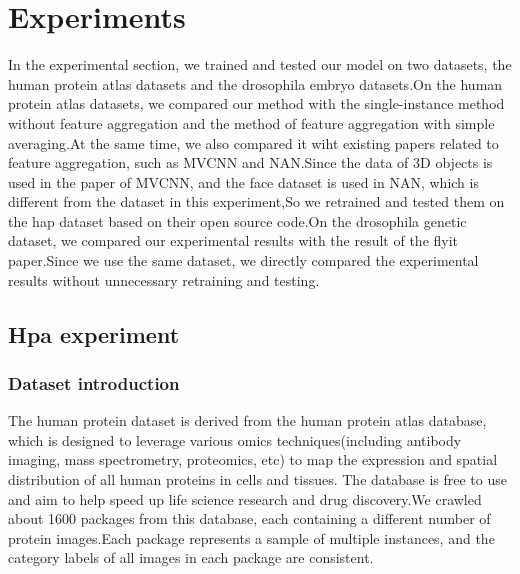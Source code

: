 \documentclass[10pt,twocolumn,letterpaper]{article}
\begin{document}
\section{Experiments}
In the experimental section, we trained and tested our model on two datasets, the human protein atlas datasets and the drosophila embryo datasets.On the human protein atlas datasets, we compared our method with the single-instance method without feature aggregation and the method of feature aggregation with simple averaging.At the same time, we also compared it wiht existing papers related to feature aggregation, such as MVCNN and NAN.Since the data of 3D objects is used in the paper of MVCNN, and the face dataset is used in NAN, which is different from the dataset in this experiment,So we retrained and tested them on the hap dataset based on their open source code.On the drosophila genetic dataset, we compared our experimental results with the result of the flyit paper.Since we use the same dataset, we directly compared the experimental results without unnecessary retraining and testing.

\subsection{Hpa experiment}

\subsubsection{Dataset introduction}
The human protein dataset is derived from the human protein atlas database, which is designed to leverage various omics techniques(including antibody imaging, mass spectrometry, proteomics, etc) to map the expression and spatial distribution of all human proteins in cells and tissues. The database is free to use and aim to help speed up life science research and drug discovery.We crawled about 1600 packages from this database, each containing a different number of protein images.Each package represents a sample of multiple instances, and the category labels of all images in each package are consistent.

\end{document}
